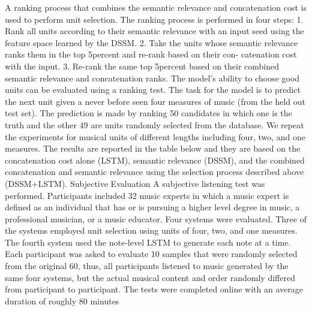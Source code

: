 A ranking process that combines the semantic relevance and concatenation cost is used to perform unit selection. The ranking process is performed in four steps:
1. Rank all units according to their semantic relevance with an input seed using the feature space learned by the DSSM.
2. Take the units whose semantic relevance ranks them in the top 5percent and re-rank based on their con- catenation cost with the input.
3. Re-rank the same top 5percent based on their combined semantic relevance and concatenation ranks.
The model’s ability to choose good units can be evaluated using a ranking test. The task for the model is to predict the next unit given a never before seen four measures of music (from the held out test set). The prediction is made by ranking 50 candidates in which one is the truth and the other 49 are units randomly selected from the database. We repeat the experiments for musical units of different lengths including four, two, and one measures. The results are reported in the table below and they are based on the concatenation cost alone (LSTM), semantic relevance (DSSM), and the combined concatenation and semantic relevance using the selection process described above (DSSM+LSTM).
Subjective Evaluation
A subjective listening test was performed. Participants included 32 music experts in which a music expert is defined as an individual that has or is pursuing a higher level degree in music, a professional musician, or a music educator. Four systems were evaluated. Three of the systems employed unit selection using units of four, two, and one measures. The fourth system used the note-level LSTM to generate each note at a time. Each participant was asked to evaluate 10 samples that were randomly selected from the original 60, thus, all participants listened to music generated by the same four systems, but the actual musical content and order randomly differed from participant to participant. The tests were completed online with an average duration of roughly 80 minutes

